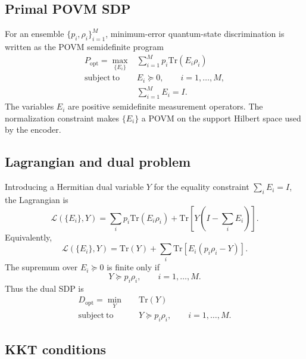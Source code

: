 \subsection*{Primal POVM SDP}

For an ensemble $\{p_i,\rho_i\}_{i=1}^M$, minimum-error quantum-state discrimination is written as the POVM semidefinite program
\begin{align}
    P_{\mathrm{opt}}
    =
    \max_{\{E_i\}}
    &\sum_{i=1}^M p_i\mathrm{Tr}(E_i\rho_i)
    \label{eq:appendix_primal_sdp}\\
    \mathrm{subject\ to}\quad
    &E_i\succeq0,\qquad i=1,\ldots,M,\nonumber\\
    &\sum_{i=1}^M E_i=I.\nonumber
\end{align}
The variables $E_i$ are positive semidefinite measurement operators. The normalization constraint makes $\{E_i\}$ a POVM on the support Hilbert space used by the encoder.

\subsection*{Lagrangian and dual problem}

Introducing a Hermitian dual variable $Y$ for the equality constraint $\sum_i E_i=I$, the Lagrangian is
\begin{equation}
    \mathcal{L}(\{E_i\},Y)
    =
    \sum_i p_i\mathrm{Tr}(E_i\rho_i)
    +
    \mathrm{Tr}\left[
    Y\left(I-\sum_iE_i\right)
    \right].
\end{equation}
Equivalently,
\begin{equation}
    \mathcal{L}(\{E_i\},Y)
    =
    \mathrm{Tr}(Y)
    +
    \sum_i
    \mathrm{Tr}\left[
    E_i(p_i\rho_i-Y)
    \right].
\end{equation}
The supremum over $E_i\succeq0$ is finite only if
\begin{equation}
    Y\succeq p_i\rho_i,\qquad i=1,\ldots,M.
\end{equation}
Thus the dual SDP is
\begin{align}
    D_{\mathrm{opt}}
    =
    \min_Y\quad
    &\mathrm{Tr}(Y)
    \label{eq:appendix_dual_sdp}\\
    \mathrm{subject\ to}\quad
    &Y\succeq p_i\rho_i,\qquad i=1,\ldots,M.\nonumber
\end{align}

\subsection*{KKT conditions}

